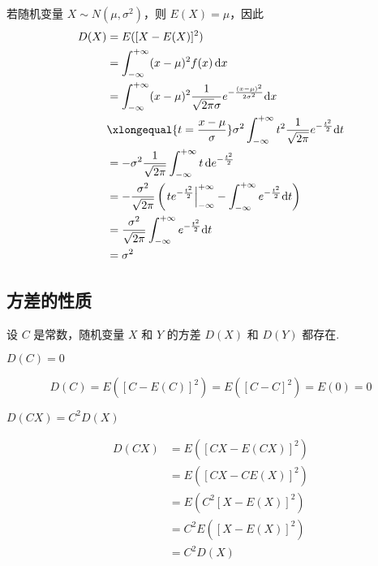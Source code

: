 若随机变量 $X \sim N(\mu,\sigma^2)$，则 $E(X)=\mu$，因此
$$
\begin{aligned}
    D(X) &= E([X-E(X)]^2) \\
    &= \int_{-\infty}^{+\infty} (x-\mu)^2 f(x) \, \text{d}x \\
    &= \int_{-\infty}^{+\infty} (x-\mu)^2 \dfrac{1}{\sqrt{2 \pi} \sigma} e^{-\frac{(x-\mu)^2}{2 \sigma^2}} \text{d}x \\
    & \xlongequal{t = \frac{x-\mu}{\sigma}} \sigma^2 \int_{-\infty}^{+\infty} t^2 \dfrac{1}{\sqrt{2 \pi}} e^{-\frac{t^2}{2}} \text{d}t \\
    &= -\sigma^2 \dfrac{1}{\sqrt{2 \pi}} \int_{-\infty}^{+\infty} t \, \text{d} e^{-\frac{t^2}{2}} \\
    &= -\dfrac{\sigma^2}{\sqrt{2 \pi}} \left( \left. t e^{-\frac{t^2}{2}} \right|_{-\infty}^{+\infty} - \int_{-\infty}^{+\infty} e^{-\frac{t^2}{2}} \text{d}t \right) \\
    &= \dfrac{\sigma^2}{\sqrt{2 \pi}} \int_{-\infty}^{+\infty} e^{-\frac{t^2}{2}} \text{d}t \\
    &= \sigma^2
\end{aligned}
$$

\subsection{方差的性质}

设 $C$ 是常数，随机变量 $X$ 和 $Y$ 的方差 $D(X)$ 和 $D(Y)$ 都存在.

\setcounter{propertyname}{0}

\begin{property}
    $D(C) = 0$
\end{property}

\begin{myproof}
    $$
    D(C) = E([C-E(C)]^2) = E([C-C]^2) = E(0) = 0
    $$
\end{myproof}

\begin{property}
    $D(CX) = C^2 D(X)$
\end{property}

\begin{myproof}
    $$
    \begin{aligned}
        D(CX) &= E([CX - E(CX)]^2) \\
        &= E([CX - CE(X)]^2) \\
        &= E(C^2 [X-E(X)]^2) \\
        &= C^2 E([X-E(X)]^2) \\
        &= C^2 D(X)
    \end{aligned}
    $$
\end{myproof}

